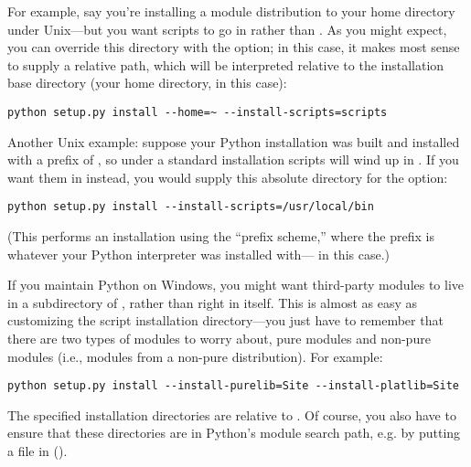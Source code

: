 \documentclass{howto}
\begin{document}
For example, say you're installing a module distribution to your home
directory under Unix---but you want scripts to go in
 rather than .
As you might expect, you can override this directory with the
 option; in this case, it makes most
sense to supply a relative path, which will be interpreted relative to
the installation base directory (your home directory, in this case):
\begin{verbatim}
python setup.py install --home=~ --install-scripts=scripts
\end{verbatim}

Another Unix example: suppose your Python installation was built and
installed with a prefix of , so under a standard 
installation scripts will wind up in .  If
you want them in  instead, you would supply this
absolute directory for the  option:
\begin{verbatim}
python setup.py install --install-scripts=/usr/local/bin
\end{verbatim}
(This performs an installation using the ``prefix scheme,'' where the
prefix is whatever your Python interpreter was installed with---
 in this case.)

If you maintain Python on Windows, you might want third-party modules to
live in a subdirectory of , rather than right in
 itself.  This is almost as easy as customizing the
script installation directory---you just have to remember that there are
two types of modules to worry about, pure modules and non-pure modules
(i.e., modules from a non-pure distribution).  For example:
\begin{verbatim}
python setup.py install --install-purelib=Site --install-platlib=Site
\end{verbatim}
The specified installation directories are relative to .
Of course, you also have to ensure that these directories are in
Python's module search path, e.g. by putting a  file in
 ().
\end{document}
